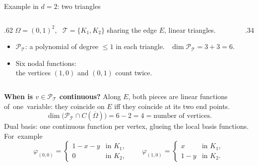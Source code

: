 \begin{frame}{Example in $d=2$: two triangles}
    \begin{columns}[c,onlytextwidth]
        \begin{column}{.62\textwidth}
            $\Omega = (0,1)^2$, \ $\mathcal T = \{K_1, K_2\}$ sharing the edge $E$, linear triangles.
            \begin{itemize}
                \item $\mathcal P_{\mathcal T}$: a polynomial of degree $\le 1$ in each triangle. \ $\dim \mathcal P_{\mathcal T} = 3 + 3 = 6$.
                \item Six nodal functions:\\ the vertices $(1,0)$ and $(0,1)$ count twice.
            \end{itemize}
        \end{column}
        \begin{column}{.34\textwidth}
            \centering
        \end{column}
    \end{columns}
    \medskip
    \textbf{When is $v \in \mathcal P_{\mathcal T}$ continuous?} Along $E$, both pieces are linear functions of~one~variable: they coincide on $E$ iff they coincide at its two end points.
    \[
        \dim\big(\mathcal P_{\mathcal T} \cap C(\overline\Omega)\big) = 6 - 2 = 4 = \text{number of vertices}.
    \]
    Dual basis: one continuous function per vertex, glueing the local basis functions. For~example
    \[
        \varphi_{(0,0)} = \begin{cases} 1 - x - y & \text{in } K_1, \\ 0 & \text{in } K_2, \end{cases}
        \qquad
        \varphi_{(1,0)} = \begin{cases} x & \text{in } K_1, \\ 1 - y & \text{in } K_2. \end{cases}
    \]
\end{frame}

